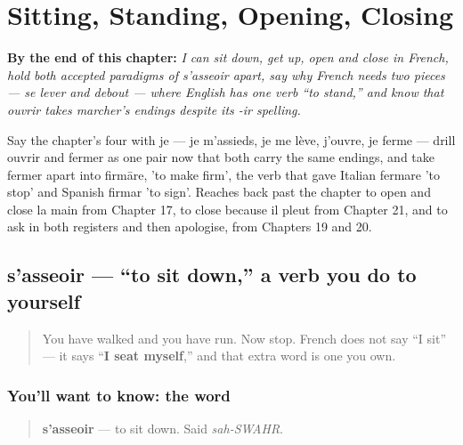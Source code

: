 
\chapter{Sitting, Standing, Opening, Closing}
\label{ch:fr-sitting-standing-opening-closing}

\begin{chapteropening}
\textbf{By the end of this chapter:} \emph{I can sit down, get up, open and close in French, hold both accepted paradigms of s'asseoir apart, say why French needs two pieces — se lever and debout — where English has one verb \textquotedblleft{}to stand,\textquotedblright{} and know that ouvrir takes marcher's endings despite its -ir spelling.}

Say the chapter's four with je — je m'assieds, je me lève, j'ouvre, je ferme — drill ouvrir and fermer as one pair now that both carry the same endings, and take fermer apart into firmāre, 'to make firm', the verb that gave Italian fermare 'to stop' and Spanish firmar 'to sign'. Reaches back past the chapter to open and close la main from Chapter 17, to close because il pleut from Chapter 21, and to ask in both registers and then apologise, from Chapters 19 and 20.
\end{chapteropening}

\section[s'asseoir]{s'asseoir — \textquotedblleft{}to sit down,\textquotedblright{} a verb you do to yourself}

\label{lesson:FR-C27-sasseoir}



\begin{quote}
You have walked and you have run. Now stop. French does not say \textquotedblleft{}I sit\textquotedblright{} — it says \textquotedblleft{}\textbf{I seat myself},\textquotedblright{} and that extra word is one you own.
\end{quote}

\subsection*{You'll want to know: the word}
\begin{quote}
\textbf{s'asseoir} — to sit down. Said \emph{sah-SWAHR}.
\end{quote}

